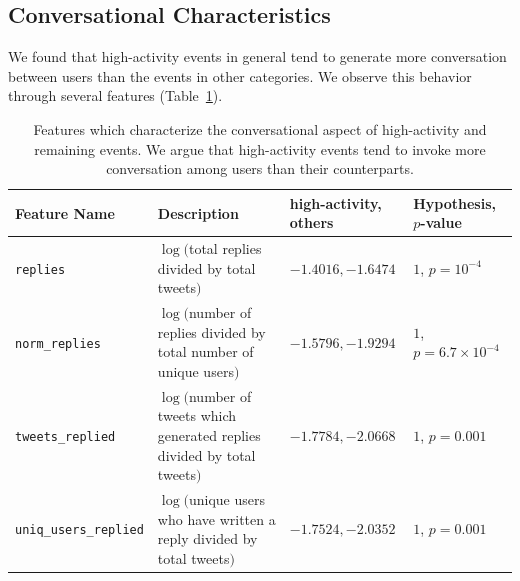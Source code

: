 

\subsection{Conversational Characteristics}
\label{subsec:conversational}

We found that high-activity events in general tend to generate more conversation
between users than the events in other categories. 
%
We observe this behavior through several features (Table~\ref{tab:conversational}).

\begin{table}
  \centering
  {\small
    \begin{tabular}{llll}
      \toprule
      Feature Name &  \multicolumn{1}{l}{Description} & high-activity, others & Hypothesis, $p$-value\\
      \midrule
      \texttt{replies} & \pbox{20cm}{$\log($total replies divided by\\ total tweets$)$} & $-1.4016, -1.6474$ & $1$, $p = 10^{-4}$ \\
      \midrule
      \texttt{norm\_replies} & \pbox{20cm}{$\log($number of replies divided\\ by total number of\\ unique users$)$} & $-1.5796, -1.9294$ & $1$, $p = 6.7\times10^{-4}$ \\
      \midrule
      \texttt{tweets\_replied} & \pbox{20cm}{$\log($number of tweets which\\ generated replies divided by\\ total tweets$)$} & $-1.7784, -2.0668$ & $1$, $p = 0.001$ \\
      \midrule
      \texttt{uniq\_users\_replied} & \pbox{20cm}{$\log($unique users who have\\ written a reply divided by\\ total tweets$)$} & $-1.7524, -2.0352$ & $1$, $p = 0.001$ \\
      \bottomrule
    \end{tabular}
  } \caption[Conversational features of events]{Features which characterize the
  conversational aspect of high-activity and remaining events. We argue that
  high-activity events tend to invoke more conversation among users than their
  counterparts.}
  \label{tab:conversational}
\end{table}

